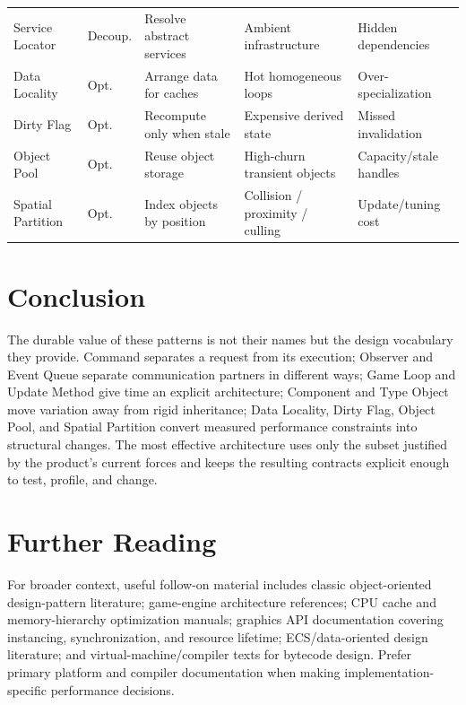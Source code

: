 \documentclass[11pt]{article}
\begin{document}
\begin{longtable}{P{2.15cm}P{1.65cm}P{3.50cm}P{3.25cm}P{3.55cm}}
Service Locator & Decoup. & Resolve abstract services & Ambient infrastructure & Hidden dependencies\\
Data Locality & Opt. & Arrange data for caches & Hot homogeneous loops & Over-specialization\\
Dirty Flag & Opt. & Recompute only when stale & Expensive derived state & Missed invalidation\\
Object Pool & Opt. & Reuse object storage & High-churn transient objects & Capacity/stale handles\\
Spatial Partition & Opt. & Index objects by position & Collision / proximity / culling & Update/tuning cost\\
\bottomrule
\end{longtable}
\normalsize

\section{Conclusion}\label{sec:conclusion}
The durable value of these patterns is not their names but the design vocabulary they provide. Command separates a request from its execution; Observer and Event Queue separate communication partners in different ways; Game Loop and Update Method give time an explicit architecture; Component and Type Object move variation away from rigid inheritance; Data Locality, Dirty Flag, Object Pool, and Spatial Partition convert measured performance constraints into structural changes. The most effective architecture uses only the subset justified by the product's current forces and keeps the resulting contracts explicit enough to test, profile, and change.

\section*{Further Reading}
For broader context, useful follow-on material includes classic object-oriented design-pattern literature; game-engine architecture references; CPU cache and memory-hierarchy optimization manuals; graphics API documentation covering instancing, synchronization, and resource lifetime; ECS/data-oriented design literature; and virtual-machine/compiler texts for bytecode design. Prefer primary platform and compiler documentation when making implementation-specific performance decisions.
\end{document}
